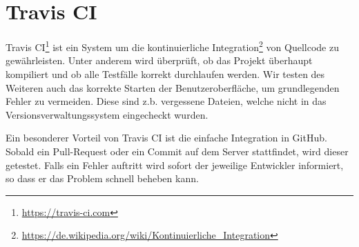 

\section{Travis CI}

Travis CI\footnote{\url{https://travis-ci.com}} ist ein System um die kontinuierliche Integration\footnote{\url{https://de.wikipedia.org/wiki/Kontinuierliche_Integration}} von Quellcode zu gew\"ahrleisten. Unter anderem wird \"uberpr\"uft, ob das Projekt \"uberhaupt kompiliert und ob alle Testf\"alle korrekt durchlaufen werden. Wir testen des Weiteren auch das korrekte Starten der Benutzeroberfl\"ache, um grundlegenden Fehler zu vermeiden. Diese sind z.b. vergessene Dateien, welche nicht in das Versionsverwaltungssystem eingecheckt wurden.

Ein besonderer Vorteil von Travis CI ist die einfache Integration in GitHub. Sobald ein Pull-Request oder ein Commit auf dem Server stattfindet, wird dieser getestet. Falls ein Fehler auftritt wird sofort der jeweilige Entwickler informiert, so dass er das Problem schnell beheben kann.